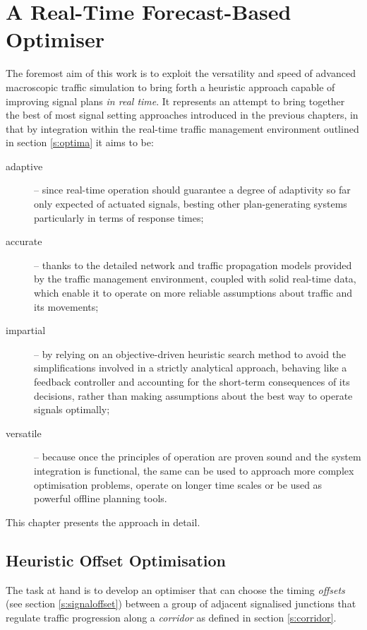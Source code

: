 \chapter{A Real-Time Forecast-Based Optimiser} \label{c:optimiser}

The foremost aim of this work is to exploit the versatility and speed of advanced macroscopic traffic simulation to bring forth a heuristic approach capable of improving signal plans \emph{in real time}.
It represents an attempt to bring together the best of most signal setting approaches introduced in the previous chapters, in that by integration within the real-time traffic management environment outlined in section \ref{s:optima} it aims to be:
\begin{description}
\item[adaptive] \--- since real-time operation should guarantee a degree of adaptivity so far only expected of actuated signals, besting other plan-generating systems particularly in terms of response times;

\item[accurate] \--- thanks to the detailed network and traffic propagation models provided by the traffic management environment, coupled with solid real-time data, which enable it to operate on more reliable assumptions about traffic and its movements;

\item[impartial] \--- by relying on an objective-driven heuristic search method to avoid the simplifications involved in a strictly analytical approach, behaving like a feedback controller and accounting for the short-term consequences of its decisions, rather than making assumptions about the best way to operate signals optimally;

\item[versatile] \--- because once the principles of operation are proven sound and the system integration is functional, the same can be used to approach more complex optimisation problems, operate on longer time scales or be used as powerful offline planning tools.
\end{description}

This chapter presents the approach in detail.




\section{Heuristic Offset Optimisation}
The task at hand is to develop an optimiser that can choose the timing \emph{offsets} (see section \ref{s:signaloffset}) between a group of adjacent signalised junctions that regulate traffic progression along a \emph{corridor} as defined in section \ref{s:corridor}.

